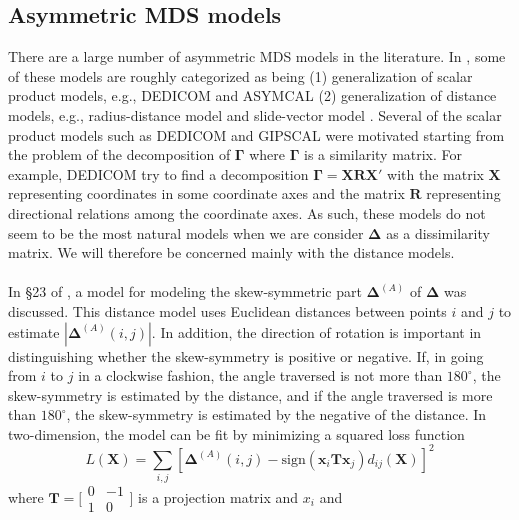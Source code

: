 \documentclass[11pt]{asaproc}
\begin{document}
\subsection{Asymmetric MDS models}
\label{sec:asymm-mds-models}
There are a large number of asymmetric MDS models in the
literature. In \citet{saito05:_data_analy_asymm_struc}, some of these
models are roughly categorized as being (1) generalization of scalar
product models, e.g., DEDICOM \citep{harshman78:_model_n} and ASYMCAL
\citep{chino78:_n} (2) generalization of distance models, e.g.,
radius-distance model \citep{okada87:_geomet} and slide-vector model
\citep{zielmand93:_analy,leeuw82:_handb}. Several of the scalar
product models such as DEDICOM and GIPSCAL were motivated starting
from the problem of the decomposition of $\bm{\Gamma}$ where
$\bm{\Gamma}$ is a similarity matrix. For example, DEDICOM try to find
a decomposition $\bm{\Gamma} = \mathbf{X} \mathbf{R} \mathbf{X}'$ with
the matrix $\mathbf{X}$ representing coordinates in some coordinate
axes and the matrix $\mathbf{R}$ representing directional relations
among the coordinate axes. As such, these models do not seem to be the
most natural models when we are consider $\bm{\Delta}$ as a
dissimilarity matrix. We will therefore be concerned mainly with the
distance models. \\ \\
%
\noindent In \S 23 of \citet{borg05:_moder}, a model for modeling the
skew-symmetric part $\bm{\Delta}^{(A)}$ of $\bm{\Delta}$ was
discussed. This distance model uses Euclidean distances between points
$i$ and $j$ to estimate $| \bm{\Delta}^{(A)}(i,j)|$. In addition, the
direction of rotation is important in distinguishing whether the
skew-symmetry is positive or negative. If, in going from  $i$ to $j$
in a clockwise fashion, the angle traversed is not more than $180^\circ$,
the skew-symmetry is estimated by the distance, and if the angle
traversed is more than $180^\circ$, the skew-symmetry is estimated by
the negative of the distance. In two-dimension, the model can be fit by minimizing a
squared loss function 
\begin{equation}
  \label{eq:4}
  L(\mathbf{X}) = \sum_{i,j}[\bm{\Delta}^{(A)}(i,j) -
  \mathrm{sign}(\mathbf{x}_i \mathbf{T} \mathbf{x}_j)
  d_{ij}(\mathbf{X})]^2
\end{equation}
where $\mathbf{T} = \bigl[ \begin{smallmatrix} 0 & -1 \\ 1 &
  0 \end{smallmatrix} \bigr]$ is a projection matrix and $x_i$ and
\end{document}
